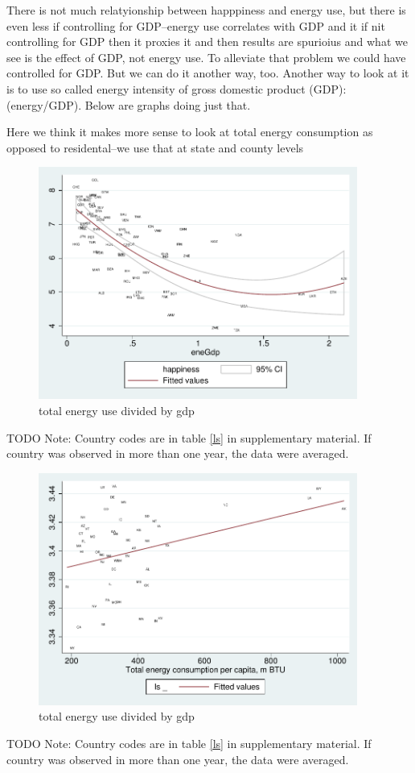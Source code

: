 \documentclass[10pt, letterpaper]{article}
\begin{document}
\begin{spacing}{1.4}
There is not much relatyionship between happpiness and energy use, but there is
even less if controlling for GDP--energy use correlates with GDP and it if nit
controlling for GDP then it proxies it and then results are spurioius and what
we see is the effect of GDP, not energy use.  
To alleviate that problem we could have controlled for GDP. But we can do it
another way, too. 
Another way to look at it is to use so called energy intensity of gross domestic
product (GDP): (energy/GDP). Below  are graphs doing just that.

Here we think it makes more sense to look at total energy consumption as opposed
to residental--we use  that at state and county levels 

\begin{figure}[H]
 \includegraphics[height=3in]{graphsAndTables/couWvsLsEnePerGdp.pdf}\centering
\caption{total energy use divided by gdp}\label{}
\end{figure}
{\scriptsize TODO Note: Country codes are in table \ref{ls} in supplementary
  material. If country was observed in more than one year, the data were averaged.}

\begin{figure}[H]
 \includegraphics[height=3in]{graphsAndTables/lfTETPBls.pdf}\centering
\caption{total energy use divided by gdp}\label{}
\end{figure}
{\scriptsize TODO Note: Country codes are in table \ref{ls} in supplementary
  material. If country was observed in more than one year, the data were averaged.}


\end{spacing}
\end{document}
